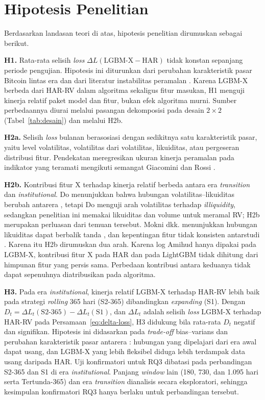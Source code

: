 \section{Hipotesis Penelitian}
\label{sec:hipotesis}
Berdasarkan landasan teori di atas, hipotesis penelitian dirumuskan sebagai
berikut.

\textbf{H1.} Rata-rata selisih \textit{loss}
$\Delta L(\text{LGBM-X} - \text{HAR})$ tidak konstan sepanjang periode
pengujian. Hipotesis ini diturunkan dari perubahan karakteristik pasar Bitcoin
lintas era \cite{do2026,mokni2024} dan dari literatur instabilitas peramalan
\cite{rossi2013,martins2016}. Karena LGBM-X berbeda dari HAR-RV dalam
algoritma sekaligus fitur masukan, H1 menguji kinerja relatif paket model dan
fitur, bukan efek algoritma murni. Sumber perbedaannya diurai melalui pasangan
dekomposisi pada desain $2 \times 2$ (Tabel~\ref{tab:desain}) dan melalui
H2b.

\textbf{H2a.} Selisih \textit{loss} bulanan berasosiasi dengan sedikitnya satu
karakteristik pasar, yaitu level volatilitas, volatilitas dari volatilitas,
likuiditas, atau pergeseran distribusi fitur. Pendekatan meregresikan ukuran
kinerja peramalan pada indikator yang teramati mengikuti semangat Giacomini dan
Rossi \cite{giacomini2009}.

\textbf{H2b.} Kontribusi fitur X terhadap kinerja relatif berbeda antara era
\textit{transition} dan \textit{institutional}. Do menunjukkan bahwa hubungan
volatilitas--likuiditas berubah antarera \cite{do2026}, tetapi Do menguji arah
volatilitas terhadap \textit{illiquidity}, sedangkan penelitian ini memakai
likuiditas dan volume untuk meramal RV; H2b merupakan perluasan dari temuan
tersebut. Mokni dkk. menunjukkan hubungan likuiditas dapat berbalik tanda
\cite{mokni2024}, dan kepentingan fitur tidak konsisten antarstudi
\cite{wang2023,feng2024ml}. Karena itu H2b dirumuskan dua arah. Karena log Amihud hanya dipakai pada
LGBM-X, kontribusi fitur X pada HAR dan pada LightGBM tidak dihitung dari
himpunan fitur yang persis sama. Perbedaan kontribusi antara keduanya tidak
dapat sepenuhnya diatribusikan pada algoritma.

\textbf{H3.} Pada era \textit{institutional}, kinerja relatif LGBM-X terhadap
HAR-RV lebih baik pada strategi \textit{rolling} 365 hari (S2-365)
dibandingkan \textit{expanding} (S1). Dengan
$D_t = \Delta L_t(\text{S2-365}) - \Delta L_t(\text{S1})$, dan $\Delta L_t$
adalah selisih \textit{loss} LGBM-X terhadap HAR-RV pada
Persamaan~\ref{eq:delta-loss}, H3 didukung bila rata-rata $D_t$ negatif dan
signifikan. Hipotesis ini
didasarkan pada \textit{trade-off} bias--varians \cite{pesaran2007,rossi2013}
dan perubahan karakteristik pasar antarera \cite{do2026}: hubungan yang
dipelajari dari era awal dapat usang, dan LGBM-X yang lebih fleksibel diduga
lebih terdampak data usang daripada HAR. Uji konfirmatori untuk RQ3 dibatasi
pada perbandingan S2-365 dan S1 di era \textit{institutional}. Panjang
\textit{window} lain (180, 730, dan 1.095 hari serta Tertunda-365) dan era
\textit{transition} dianalisis secara eksploratori, sehingga kesimpulan
konfirmatori RQ3 hanya berlaku untuk perbandingan tersebut.

